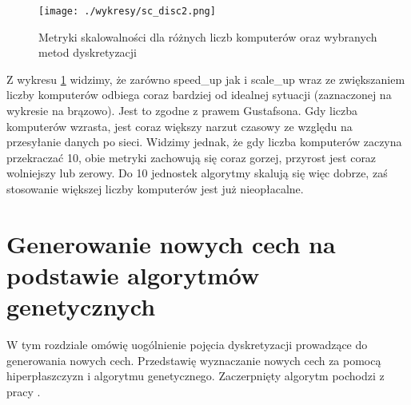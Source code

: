 \documentclass[magisterska]{pracamgr}
\theoremstyle{plain}
\theoremstyle{definition}
\theoremstyle{remark}
\begin{document}
\begin{figure}
 \caption{Metryki skalowalności dla różnych liczb komputerów oraz wybranych metod dyskretyzacji}\label{fig:sc_disc}
 \centering\texttt{[image: ./wykresy/sc\_disc2.png]}
\end{figure}

Z wykresu \ref{fig:sc_disc} widzimy, że zarówno speed\_up jak i scale\_up wraz ze zwiększaniem liczby komputerów odbiega coraz bardziej od idealnej sytuacji 
(zaznaczonej na wykresie na brązowo). Jest to zgodne z prawem Gustafsona. Gdy liczba komputerów wzrasta, jest coraz większy narzut czasowy
ze względu na przesyłanie danych po sieci. Widzimy jednak, że gdy liczba komputerów zaczyna przekraczać 10, obie 
metryki zachowują się coraz gorzej, przyrost jest coraz wolniejszy lub zerowy. Do 10 jednostek algorytmy skalują się więc dobrze, 
zaś stosowanie większej liczby komputerów jest już nieopłacalne.



\chapter{Generowanie nowych cech na podstawie algorytmów genetycznych}

W tym rozdziale omówię uogólnienie pojęcia dyskretyzacji prowadzące do generowania nowych cech.
Przedstawię wyznaczanie nowych cech za pomocą hiperpłaszczyzn i algorytmu genetycznego. Zaczerpnięty algorytm
pochodzi z pracy \cite{Hyperplanes}.
\end{document}
